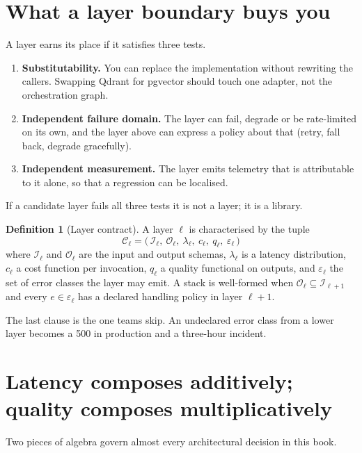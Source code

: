 \documentclass[11pt,twoside,openright]{book}
\theoremstyle{definition}
\newtheorem{definition}{Definition}[chapter]
\theoremstyle{plain}
\theoremstyle{remark}
\newcommand{\term}[1]{\textbf{#1}}
\begin{document}
\section{What a layer boundary buys you}

A layer earns its place if it satisfies three tests.

\begin{enumerate}[leftmargin=1.6em]
  \item \term{Substitutability.} You can replace the implementation without
        rewriting the callers. Swapping Qdrant for pgvector should touch one
        adapter, not the orchestration graph.
  \item \term{Independent failure domain.} The layer can fail, degrade or be
        rate-limited on its own, and the layer above can express a policy about
        that (retry, fall back, degrade gracefully).
  \item \term{Independent measurement.} The layer emits telemetry that is
        attributable to it alone, so that a regression can be localised.
\end{enumerate}

If a candidate layer fails all three tests it is not a layer; it is a library.

\begin{definition}[Layer contract]
A layer $\ell$ is characterised by the tuple
\[
  \mathcal{C}_\ell = \bigl(\,\mathcal{I}_\ell,\ \mathcal{O}_\ell,\
   \lambda_\ell,\ c_\ell,\ q_\ell,\ \varepsilon_\ell\,\bigr)
\]
where $\mathcal{I}_\ell$ and $\mathcal{O}_\ell$ are the input and output
schemas, $\lambda_\ell$ is a latency distribution, $c_\ell$ a cost function per
invocation, $q_\ell$ a quality functional on outputs, and $\varepsilon_\ell$ the
set of error classes the layer may emit. A stack is well-formed when
$\mathcal{O}_\ell \subseteq \mathcal{I}_{\ell+1}$ and every
$e \in \varepsilon_\ell$ has a declared handling policy in layer $\ell+1$.
\end{definition}

The last clause is the one teams skip. An undeclared error class from a lower
layer becomes a 500 in production and a three-hour incident.

\section{Latency composes additively; quality composes multiplicatively}

Two pieces of algebra govern almost every architectural decision in this book.
\end{document}
